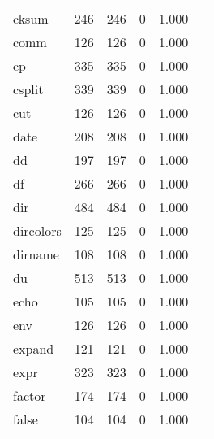 \begin{longtable}{lp{2.40cm}p{2.40cm}p{2.40cm}p{2.40cm}p{2.40cm}}
cksum     &                     246 &              246 &                 0 &                        1.000 \\
comm      &                     126 &              126 &                 0 &                        1.000 \\
cp        &                     335 &              335 &                 0 &                        1.000 \\
csplit    &                     339 &              339 &                 0 &                        1.000 \\
cut       &                     126 &              126 &                 0 &                        1.000 \\
date      &                     208 &              208 &                 0 &                        1.000 \\
dd        &                     197 &              197 &                 0 &                        1.000 \\
df        &                     266 &              266 &                 0 &                        1.000 \\
dir       &                     484 &              484 &                 0 &                        1.000 \\
dircolors &                     125 &              125 &                 0 &                        1.000 \\
dirname   &                     108 &              108 &                 0 &                        1.000 \\
du        &                     513 &              513 &                 0 &                        1.000 \\
echo      &                     105 &              105 &                 0 &                        1.000 \\
env       &                     126 &              126 &                 0 &                        1.000 \\
expand    &                     121 &              121 &                 0 &                        1.000 \\
expr      &                     323 &              323 &                 0 &                        1.000 \\
factor    &                     174 &              174 &                 0 &                        1.000 \\
false     &                     104 &              104 &                 0 &                        1.000 \\

\end{longtable}
